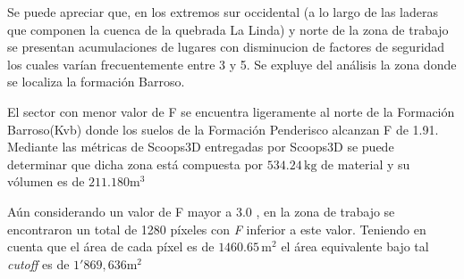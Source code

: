 Se puede apreciar que, en los extremos sur occidental (a lo largo de las laderas que componen la cuenca de la quebrada La Linda) y norte de la zona de trabajo se presentan acumulaciones de lugares con disminucion de factores de seguridad los cuales var\'ian frecuentemente entre 3 y 5. Se expluye del an\'alisis la zona donde se localiza la formaci\'on Barroso.

El sector con menor valor de F se encuentra ligeramente al norte de la Formaci\'on Barroso(Kvb) donde los suelos de la Formaci\'on Penderisco alcanzan F de 1.91.  Mediante las m\'etricas de Scoops3D entregadas por Scoops3D se puede determinar que dicha zona est\'a compuesta por  $534.24\,\text{kg}$ de material y su v\'olumen es de $211.180\text{m}^{3}$


A\'un considerando un valor de F mayor a 3.0 , en la zona de trabajo se encontraron un total de 1280 p\'ixeles con \textit{F} inferior a este valor. Teniendo en cuenta que el \'area de cada p\'ixel es de  $1460.65\,\text{m}^{2}$ el \'area  equivalente bajo tal \textit{cutoff} es de $1'869,636 \text{m}^{2}$


